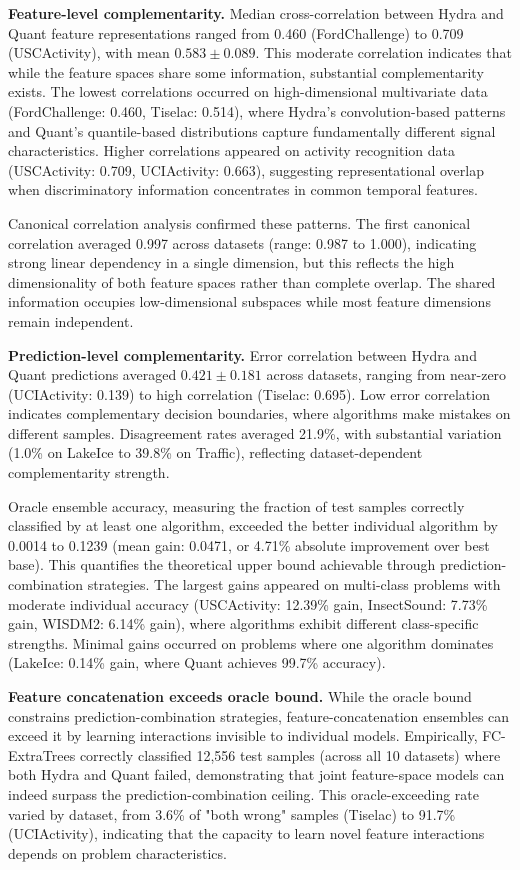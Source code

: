 \documentclass[pdflatex,sn-basic]{sn-jnl}           %
\theoremstyle{thmstyleone}%
\theoremstyle{thmstyletwo}%
\theoremstyle{thmstylethree}%
\begin{document}
\textbf{Feature-level complementarity.} Median cross-correlation between Hydra and Quant feature representations ranged from 0.460 (FordChallenge) to 0.709 (USCActivity), with mean $0.583 \pm 0.089$. This moderate correlation indicates that while the feature spaces share some information, substantial complementarity exists. The lowest correlations occurred on high-dimensional multivariate data (FordChallenge: 0.460, Tiselac: 0.514), where Hydra's convolution-based patterns and Quant's quantile-based distributions capture fundamentally different signal characteristics. Higher correlations appeared on activity recognition data (USCActivity: 0.709, UCIActivity: 0.663), suggesting representational overlap when discriminatory information concentrates in common temporal features.

Canonical correlation analysis confirmed these patterns. The first canonical correlation averaged 0.997 across datasets (range: 0.987 to 1.000), indicating strong linear dependency in a single dimension, but this reflects the high dimensionality of both feature spaces rather than complete overlap. The shared information occupies low-dimensional subspaces while most feature dimensions remain independent.

\textbf{Prediction-level complementarity.} Error correlation between Hydra and Quant predictions averaged $0.421 \pm 0.181$ across datasets, ranging from near-zero (UCIActivity: 0.139) to high correlation (Tiselac: 0.695). Low error correlation indicates complementary decision boundaries, where algorithms make mistakes on different samples. Disagreement rates averaged 21.9\%, with substantial variation (1.0\% on LakeIce to 39.8\% on Traffic), reflecting dataset-dependent complementarity strength.

Oracle ensemble accuracy, measuring the fraction of test samples correctly classified by at least one algorithm, exceeded the better individual algorithm by 0.0014 to 0.1239 (mean gain: 0.0471, or 4.71\% absolute improvement over best base). This quantifies the theoretical upper bound achievable through prediction-combination strategies. The largest gains appeared on multi-class problems with moderate individual accuracy (USCActivity: 12.39\% gain, InsectSound: 7.73\% gain, WISDM2: 6.14\% gain), where algorithms exhibit different class-specific strengths. Minimal gains occurred on problems where one algorithm dominates (LakeIce: 0.14\% gain, where Quant achieves 99.7\% accuracy).

\textbf{Feature concatenation exceeds oracle bound.} While the oracle bound constrains prediction-combination strategies, feature-concatenation ensembles can exceed it by learning interactions invisible to individual models. Empirically, FC-ExtraTrees correctly classified 12,556 test samples (across all 10 datasets) where both Hydra and Quant failed, demonstrating that joint feature-space models can indeed surpass the prediction-combination ceiling. This oracle-exceeding rate varied by dataset, from 3.6\% of "both wrong" samples (Tiselac) to 91.7\% (UCIActivity), indicating that the capacity to learn novel feature interactions depends on problem characteristics.
\end{document}
